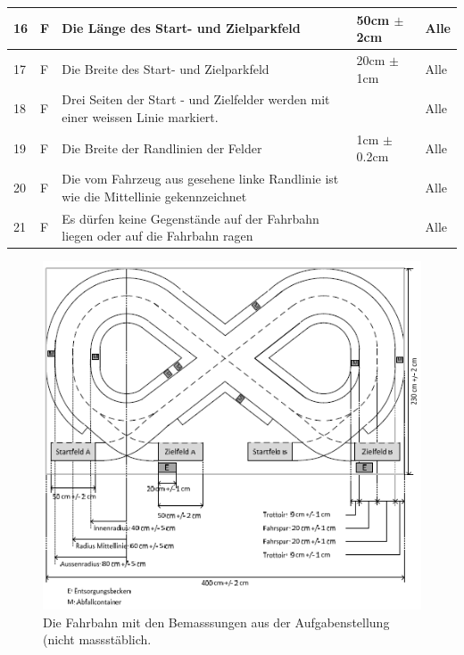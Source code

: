 \begin{center}
\begin{tabular}{|p{1cm}|p{0.5cm}|p{5cm}|p{5cm}|p{1.5cm}|}
  16 & F & Die Länge des Start- und Zielparkfeld & 50cm $\pm$ 2cm & Alle\\ \hline
  17 & F & Die Breite des Start- und Zielparkfeld & 20cm $\pm$ 1cm & Alle\\ \hline
  18 & F & Drei Seiten der Start - und Zielfelder werden mit einer weissen Linie markiert. & & Alle\\ \hline
  19 & F & Die Breite der Randlinien der Felder & 1cm $\pm$ 0.2cm & Alle\\ \hline
  20 & F & Die vom Fahrzeug aus gesehene linke Randlinie ist wie die Mittellinie gekennzeichnet & & Alle\\\hline
  21 & F & Es dürfen keine Gegenstände auf der Fahrbahn liegen oder auf die Fahrbahn ragen & & Alle\\\hline
\end{tabular}
\end{center}

\begin{figure}[ht]
	\centering									
	\includegraphics{Images/Fahrbahn.png}
	\caption{Die Fahrbahn mit den Bemasssungen aus der Aufgabenstellung (nicht massstäblich.}
	\label{fig1}
\end{figure}